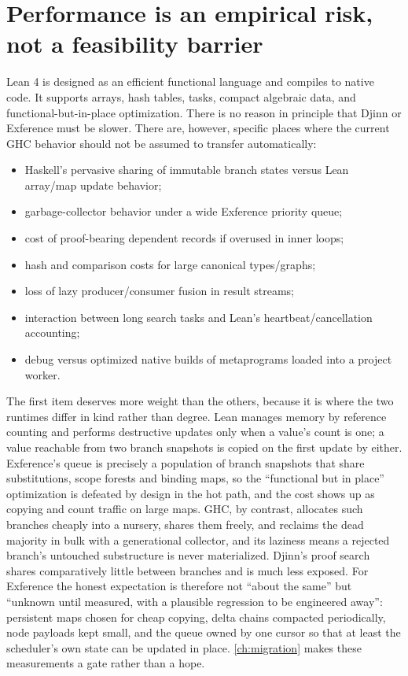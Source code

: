 \documentclass[10pt,letterpaper,oneside]{report}
\begin{document}
\section{Performance is an empirical risk, not a feasibility barrier}\label{sec:performance}

Lean 4 is designed as an efficient functional language and compiles to native code. It supports arrays, hash tables, tasks, compact algebraic data, and functional-but-in-place optimization. There is no reason in principle that Djinn or Exference must be slower. There are, however, specific places where the current GHC behavior should not be assumed to transfer automatically:

\begin{itemize}
  \item Haskell's pervasive sharing of immutable branch states versus Lean array/map update behavior;
  \item garbage-collector behavior under a wide Exference priority queue;
  \item cost of proof-bearing dependent records if overused in inner loops;
  \item hash and comparison costs for large canonical types/graphs;
  \item loss of lazy producer/consumer fusion in result streams;
  \item interaction between long search tasks and Lean's heartbeat/cancellation accounting;
  \item debug versus optimized native builds of metaprograms loaded into a project worker.
\end{itemize}

The first item deserves more weight than the others, because it is where the two runtimes differ in kind rather than degree. Lean manages memory by reference counting and performs destructive updates only when a value's count is one; a value reachable from two branch snapshots is copied on the first update by either. Exference's queue is precisely a population of branch snapshots that share substitutions, scope forests and binding maps, so the ``functional but in place'' optimization is defeated by design in the hot path, and the cost shows up as copying and count traffic on large maps. GHC, by contrast, allocates such branches cheaply into a nursery, shares them freely, and reclaims the dead majority in bulk with a generational collector, and its laziness means a rejected branch's untouched substructure is never materialized. Djinn's proof search shares comparatively little between branches and is much less exposed. For Exference the honest expectation is therefore not ``about the same'' but ``unknown until measured, with a plausible regression to be engineered away'': persistent maps chosen for cheap copying, delta chains compacted periodically, node payloads kept small, and the queue owned by one cursor so that at least the scheduler's own state can be updated in place. \autoref{ch:migration} makes these measurements a gate rather than a hope.
\end{document}
